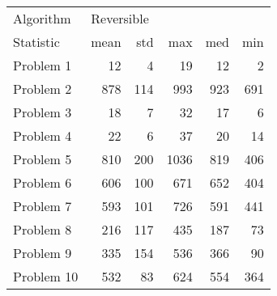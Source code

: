 \begin{tabular}{lrrrrr}
\toprule
Algorithm & \multicolumn{5}{l}{Reversible} \\
Statistic &       mean &  std &   max &  med &  min \\
\midrule
Problem 1  &         12 &    4 &    19 &   12 &    2 \\
Problem 2  &        878 &  114 &   993 &  923 &  691 \\
Problem 3  &         18 &    7 &    32 &   17 &    6 \\
Problem 4  &         22 &    6 &    37 &   20 &   14 \\
Problem 5  &        810 &  200 &  1036 &  819 &  406 \\
Problem 6  &        606 &  100 &   671 &  652 &  404 \\
Problem 7  &        593 &  101 &   726 &  591 &  441 \\
Problem 8  &        216 &  117 &   435 &  187 &   73 \\
Problem 9  &        335 &  154 &   536 &  366 &   90 \\
Problem 10 &        532 &   83 &   624 &  554 &  364 \\
\bottomrule
\end{tabular}
